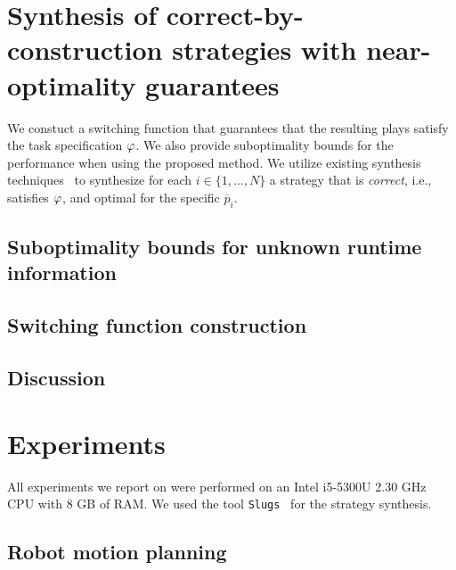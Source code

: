 


\section{Synthesis of correct-by-construction strategies with near-optimality guarantees}

We constuct a switching function that guarantees that the resulting plays satisfy the task specification $\varphi$. We also provide suboptimality bounds for the performance when using the proposed method. We utilize existing synthesis techniques~\cite{Ehlerscost} to synthesize for each $i \in \{1,\ldots,N\}$ a strategy that is \emph{correct}, i.e., satisfies $\varphi$, and optimal for the specific $\overline{p}_i$.

\subsection{Suboptimality bounds for unknown runtime information}
\label{sec:generalization}


\subsection{Switching function construction}\label{sec:switching}


\subsection{Discussion}



\section{Experiments}
All experiments we report on were performed on an Intel i5-5300U 2.30 GHz CPU with 8 GB of RAM.  We used the tool \texttt{Slugs}~\cite{Ehlerslugs} for the strategy synthesis. 

\subsection{Robot motion planning}

